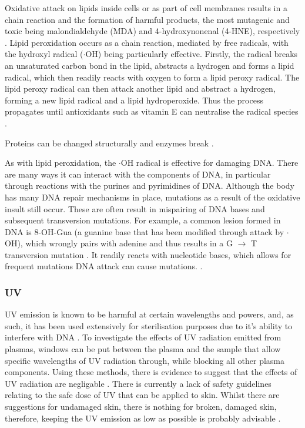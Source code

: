 \documentclass[11pt, oneside]{article}   	%
\begin{document}
Oxidative attack on lipids inside cells or as part of cell membranes results in a chain reaction and the formation of harmful products, the most mutagenic and toxic being malondialdehyde (MDA) and 4-hydroxynonenal (4-HNE), respectively \cite{Ayala2014lipid}.
Lipid peroxidation occurs as a chain reaction, mediated by free radicals, with the hydroxyl radical ($\cdot$OH) being particularly effective.
Firstly, the radical breaks an unsaturated carbon bond in the lipid, abstracts a hydrogen and forms a lipid radical, which then readily reacts with oxygen to form a lipid peroxy radical.
The lipid peroxy radical can then attack another lipid and abstract a hydrogen, forming a new lipid radical and a lipid hydroperoxide. 
Thus the process propagates until antioxidants such as vitamin E can neutralise the radical species \cite{Ayala2014lipid}.

Proteins can be changed structurally and enzymes break \cite{PhamHuy2008free}.

As with lipid peroxidation, the $\cdot$OH radical is effective for damaging DNA. 
There are many ways it can interact with the components of DNA, in particular through reactions with the purines and pyrimidines of DNA.
Although the body has many DNA repair mechanisms in place, mutations as a result of the oxidative insult still occur.
These are often result in mispairing of DNA bases and subsequent transversion mutations.
For example, a common lesion formed in DNA is 8-OH-Gua (a guanine base that has been modified through attack by $\cdot$OH), which wrongly pairs with adenine and thus results in a G $\rightarrow$ T transversion mutation \cite{Dizdaroglu2012oxidatively}.
It readily reacts with nucleotide bases, which allows for frequent mutations 
DNA attack can cause mutations. \cite{PhamHuy2008free}.






\subsubsection{UV}
UV emission is known to be harmful at certain wavelengths and powers, and, as such, it has been used extensively for sterilisation purposes due to it's ability to interfere with DNA \cite{Laroussi2004evaluation}.
To investigate the effects of UV radiation emitted from plasmas, windows can be put between the plasma and the sample that allow specific wavelengths of UV radiation through, while blocking all other plasma components. 
Using these methods, there is evidence to suggest that the effects of UV radiation are negligable \cite{Laroussi2004evaluation, Dobrynin2009physical}.
There is currently a lack of safety guidelines relating to the safe dose of UV that can be applied to skin.
Whilst there are suggestions for undamaged skin, there is nothing for broken, damaged skin, therefore, keeping the UV emission as low as possible is probably advisable \cite{Isbary2013cold}.
\end{document}
